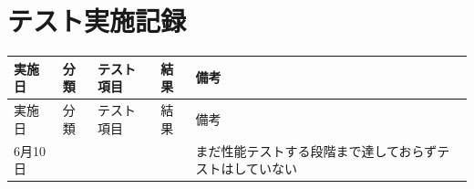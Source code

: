
\section{テスト実施記録}

\begin{longtable}{p{2cm}p{2cm}p{4.5cm}p{1.5cm}p{4cm}}
\toprule
実施日 & 分類 & テスト項目 & 結果 & 備考 \\
\midrule
\endfirsthead

\toprule
実施日 & 分類 & テスト項目 & 結果 & 備考 \\
6月10日 &  &  &  & まだ性能テストする段階まで達しておらずテストはしていない \\
\midrule
\endhead


\end{longtable}
